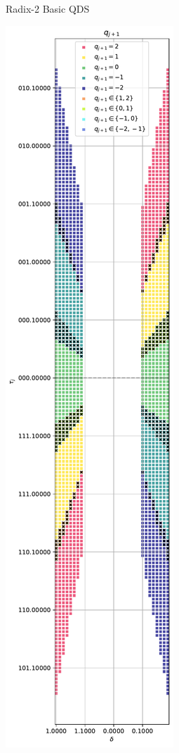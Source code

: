 \documentclass{article}
\begin{document}
\begin{figure}[htbp]
\begin{subfigure}[b]{0.32\textwidth}
    \caption{Radix-2 Basic QDS}
    \label{fig:division:radix2_basic}
  \end{subfigure}
  \hfill
  \begin{subfigure}[b]{0.32\textwidth}
    \centering
    \includegraphics[width=\textwidth, height=3.5\textwidth, keepaspectratio=true]{../figures/division/radix4_qds_basic_quadrants_1_2_3_4.pdf}

\end{subfigure}
\end{figure}
\end{document}
